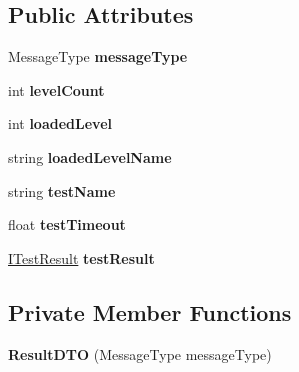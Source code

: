 \subsection*{Public Attributes}
\begin{DoxyCompactItemize}
\item 
\mbox{\label{class_unity_test_1_1_result_d_t_o_a6b4407c6f762c52837d086d447717ff8}} 
Message\+Type {\bfseries message\+Type}
\item 
\mbox{\label{class_unity_test_1_1_result_d_t_o_a8f0dcc4505d89ca3a2323f06e6d4c496}} 
int {\bfseries level\+Count}
\item 
\mbox{\label{class_unity_test_1_1_result_d_t_o_a618ad5c15ea3bd06496302f23cf6889b}} 
int {\bfseries loaded\+Level}
\item 
\mbox{\label{class_unity_test_1_1_result_d_t_o_a3b90061ebbca76c69c2106c8998f1e8d}} 
string {\bfseries loaded\+Level\+Name}
\item 
\mbox{\label{class_unity_test_1_1_result_d_t_o_ab25c79df3eb2ed0d72a4e9383538ae05}} 
string {\bfseries test\+Name}
\item 
\mbox{\label{class_unity_test_1_1_result_d_t_o_a74b4dd517e014680f5481f01a1c0a59d}} 
float {\bfseries test\+Timeout}
\item 
\mbox{\label{class_unity_test_1_1_result_d_t_o_abeeb48afb0ac04d2d5b444334e35384c}} 
\hyperlink{interface_i_test_result}{I\+Test\+Result} {\bfseries test\+Result}
\end{DoxyCompactItemize}
\subsection*{Private Member Functions}
\begin{DoxyCompactItemize}
\item 
\mbox{\label{class_unity_test_1_1_result_d_t_o_ae6b873e24423939bfe140661628d82ea}} 
{\bfseries Result\+D\+TO} (Message\+Type message\+Type)
\end{DoxyCompactItemize}
